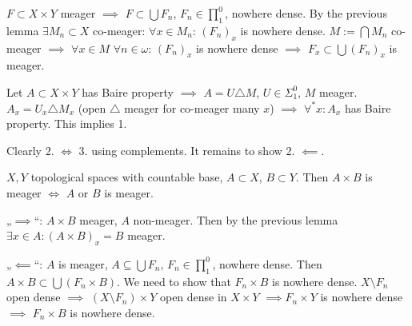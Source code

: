 \documentclass[12pt]{article}					%
\begin{document}
\begin{dukazin}
	$F \subset X \times Y$ meager $\implies$ $F \subset \bigcup F_n$, $F_n \in ∏_1^0$, nowhere dense. By the previous lemma $\exists M_n \subset X$ co-meager: $\forall x \in M_n$: $(F_n)_x$ is nowhere dense. $M := \bigcap M_n$ co-meager $\implies$ $\forall x \in M$ $\forall n \in ω$: $(F_n)_x$ is nowhere dense $\implies$ $F_x \subset \bigcup (F_n)_x$ is meager.

	Let $A \subset X \times Y$ has Baire property $\implies$ $A = U \triangle M$, $U \in Σ_1^0$, $M$ meager. $A_x = U_x \triangle M_x$ (open $\triangle$ meager for co-meager many $x$) $\implies$ $\forall^* x: A_x$ has Baire property. This implies 1.

	Clearly 2. $\Leftrightarrow$ 3. using complements. It remains to show 2. $\impliedby$.
\end{dukazin}

\begin{lemma}
	$X, Y$ topological spaces with countable base, $A \subset X$, $B \subset Y$. Then $A \times B$ is meager $\Leftrightarrow$ $A$ or $B$ is meager.

	\begin{dukazin}
		„$\implies$“: $A \times B$ meager, $A$ non-meager. Then by the previous lemma $\exists x \in A: (A \times B)_x = B$ meager.

		„$\impliedby$“: $A$ is meager, $A \subseteq \bigcup F_n$, $F_n \in ∏_1^0$, nowhere dense. Then $A \times B \subset \bigcup(F_n \times B)$. We need to show that $F_n \times B$ is nowhere dense. $X \setminus F_n$ open dense $\implies$ $(X \setminus F_n) \times Y$ open dense in $X \times Y$ $\implies F_n \times Y$ is nowhere dense $\implies$ $F_n \times B$ is nowhere dense.
	\end{dukazin}
\end{lemma}
\end{document}
